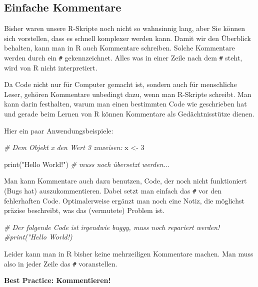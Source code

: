 \documentclass[
]{book}
\newenvironment{Shaded}{\begin{snugshade}}{\end{snugshade}}
\newcommand{\CommentTok}[1]{\textcolor[rgb]{0.56,0.35,0.01}{\textit{#1}}}
\newcommand{\DecValTok}[1]{\textcolor[rgb]{0.00,0.00,0.81}{#1}}
\newcommand{\FunctionTok}[1]{\textcolor[rgb]{0.00,0.00,0.00}{#1}}
\newcommand{\NormalTok}[1]{#1}
\newcommand{\OtherTok}[1]{\textcolor[rgb]{0.56,0.35,0.01}{#1}}
\newcommand{\StringTok}[1]{\textcolor[rgb]{0.31,0.60,0.02}{#1}}
\begin{document}
\hypertarget{einfache-kommentare}{%
\subsection{Einfache Kommentare}\label{einfache-kommentare}}

Bisher waren unsere R-Skripte noch nicht so wahnsinnig lang, aber Sie können sich vorstellen, dass es schnell komplexer werden kann. Damit wir den Überblick behalten, kann man in R auch Kommentare schreiben. Solche Kommentare werden durch ein \texttt{\#} gekennzeichnet. Alles was in einer Zeile nach dem \texttt{\#} steht, wird von R nicht interpretiert.

Da Code nicht nur für Computer gemacht ist, sondern auch für menschliche Leser, gehören Kommentare unbedingt dazu, wenn man R-Skripte schreibt. Man kann darin festhalten, warum man einen bestimmten Code wie geschrieben hat und gerade beim Lernen von R können Kommentare als Gedächtnisstütze dienen.

Hier ein paar Anwendungsbeispiele:

\begin{Shaded}
\begin{Highlighting}[]
\CommentTok{\# Dem Objekt x den Wert 3 zuweisen:}
\NormalTok{x }\OtherTok{\textless{}{-}} \DecValTok{3}

\FunctionTok{print}\NormalTok{(}\StringTok{"Hello World!"}\NormalTok{) }\CommentTok{\# muss noch übersetzt werden...}
\end{Highlighting}
\end{Shaded}

Man kann Kommentare auch dazu benutzen, Code, der noch nicht funktioniert (Bugs hat) auszukommentieren. Dabei setzt man einfach das \texttt{\#} vor den fehlerhaften Code. Optimalerweise ergänzt man noch eine Notiz, die möglichst präzise beschreibt, was das (vermutete) Problem ist.

\begin{Shaded}
\begin{Highlighting}[]
\CommentTok{\# Der folgende Code ist irgendwie buggy, muss noch repariert werden! }
\CommentTok{\#print("Hello World!)}
\end{Highlighting}
\end{Shaded}

Leider kann man in R bisher keine mehrzeiligen Kommentare machen. Man muss also in jeder Zeile das \texttt{\#} voranstellen.

\leavevmode\hypertarget{hint_short_cut}{}%
\textbf{Best Practice: Kommentieren!}
\end{document}
